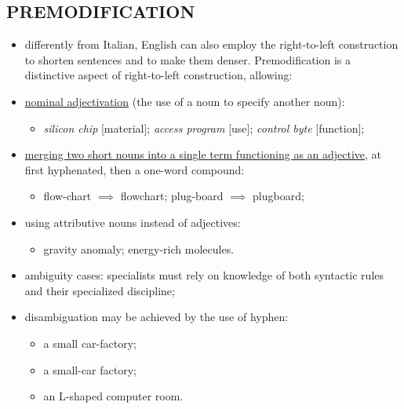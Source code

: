 \subsection{PREMODIFICATION}

\begin{itemize}

\item differently from Italian, English can also employ the right-to-left construction to shorten sentences and to make them denser. Premodification is a distinctive aspect of right-to-left construction, allowing:

\item\underline{nominal adjectivation} (the use of a noun to specify another noun):

\begin{itemize}
\item \textit{silicon chip} [material]; \textit{access program} [use]; \textit{control byte} [function];
\end{itemize}

\item\underline{merging two short nouns into a single term functioning as an adjective}, at first hyphenated, then a one-word compound:

\begin{itemize}
\item flow-chart $\implies$ flowchart; plug-board $\implies$ plugboard;
\end{itemize}

\item using attributive nouns instead of adjectives:

\begin{itemize}
\item gravity anomaly; energy-rich molecules.
\end{itemize}

\item ambiguity cases: specialists must rely on knowledge of both syntactic rules and their specialized discipline;
\item disambiguation may be achieved by the use of hyphen: 

\begin{itemize}
\item a small car-factory;
\item a small-car factory;
\item an L-shaped computer room.
\end{itemize}

\end{itemize}

